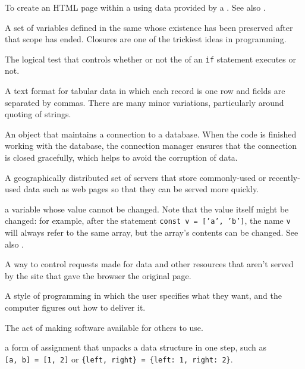 \begin{description}
To create an HTML page within a  using data provided by a
. See also .

A set of variables defined in the same  whose existence has
been preserved after that scope has ended. Closures are one of the trickiest
ideas in programming.

The logical test that controls whether or not the 
of an \texttt{if} statement executes or not.

A text format for tabular data in which each record is one row and fields are
separated by commas. There are many minor variations, particularly around
quoting of strings.

An object that maintains a connection to a database. When the code is
finished working with the database, the connection manager ensures that the
connection is closed gracefully, which helps to avoid the corruption of data.

A geographically distributed set of servers that store commonly-used or
recently-used data such as web pages so that they can be served more quickly.

a variable whose value cannot be changed. Note that the value itself might be
changed: for example, after the statement \texttt{const\ v\ =\ ['a',\ 'b']}, the name \texttt{v}
will always refer to the same array, but the array's contents can be changed.
See also .

A way to control requests made for data and other resources that aren't served
by the site that gave the browser the original page.

A style of programming in which the user specifies what they want, and the
computer figures out how to deliver it.

The act of making software available for others to use.

a form of assignment that unpacks a data structure in one step, such as \texttt{[a,\ b]\ =\ [1,\ 2]} or \texttt{\{left,\ right\}\ =\ \{left:\ 1,\ right:\ 2\}}.


\end{description}
